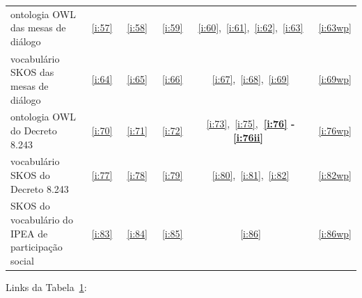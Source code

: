 \documentclass[12pt]{article}
\begin{document}
\begin{table}[htpq!]
\begin{tabular}{| p{} | c | c | c | c | c | }
ontologia   OWL  das mesas de diálogo &~\ref{i:57}&~\ref{i:58}&~\ref{i:59}&~\ref{i:60},~\ref{i:61},~\ref{i:62},~\ref{i:63}&~\ref{i:63wp} \\
vocabulário SKOS das mesas de diálogo &~\ref{i:64}&~\ref{i:65}&~\ref{i:66}&~\ref{i:67},~\ref{i:68},~\ref{i:69}&~\ref{i:69wp} \\\hline\hline

ontologia   OWL  do Decreto 8.243 &~\ref{i:70}&~\ref{i:71}&~\ref{i:72}&~\ref{i:73},~\ref{i:75},{\bf ~\ref{i:76} - \ref{i:76ii} }&~\ref{i:76wp} \\
vocabulário SKOS do Decreto 8.243 &~\ref{i:77}&~\ref{i:78}&~\ref{i:79}&~\ref{i:80},~\ref{i:81},~\ref{i:82}&~\ref{i:82wp} \\\hline\hline

SKOS do vocabulário do IPEA de participação social &~\ref{i:83}&~\ref{i:84}&~\ref{i:85}&~\ref{i:86}&~\ref{i:86wp} \\\hline\hline
\end{tabular}\label{tab:ovbs}
\end{table}
\vspace{1cm}
Links da Tabela~\ref{tab:ovbs}:
\end{document}
